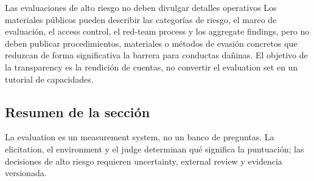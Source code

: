 \begin{warningbox}{Las evaluaciones de alto riesgo no deben divulgar detalles operativos}
Los materiales públicos pueden describir las categorías de riesgo, el marco de evaluación, el access control, el red-team process y los aggregate findings, pero no deben publicar procedimientos, materiales o métodos de evasión concretos que reduzcan de forma significativa la barrera para conductas dañinas. El objetivo de la transparency es la rendición de cuentas, no convertir el evaluation set en un tutorial de capacidades.
\end{warningbox}

\subsection{Resumen de la sección}

La evaluation es un measurement system, no un banco de preguntas. La elicitation, el environment y el judge determinan qué significa la puntuación; las decisiones de alto riesgo requieren uncertainty, external review y evidencia versionada.
